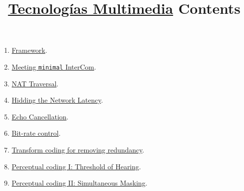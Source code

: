 
\title{\href{https://tecnologias-multimedia.github.io/}{Tecnologías Multimedia} \newline Contents}

\maketitle

\begin{enumerate}
\item \href{https://tecnologias-multimedia.github.io/contents/framework/}{Framework}. %
\item \href{https://tecnologias-multimedia.github.io/contents/minimal/}{Meeting \texttt{minimal} InterCom}. %
\item \href{https://tecnologias-multimedia.github.io/contents/NAT_traversal/}{NAT Traversal}. %
\item \href{https://tecnologias-multimedia.github.io/contents/latency/}{Hidding the Network Latency}. %
\item \href{https://tecnologias-multimedia.github.io/contents/echo_cancellation/}{Echo Cancellation}. %
\item \href{https://tecnologias-multimedia.github.io/contents/BR_control/}{Bit-rate control}. %
\item \href{https://tecnologias-multimedia.github.io/contents/transform_coding/}{Transform coding for removing redundancy}. %
\item \href{https://tecnologias-multimedia.github.io/contents/threshold_of_hearing/}{Perceptual coding I: Threshold of Hearing}.
\item \href{https://tecnologias-multimedia.github.io/contents/simultaneous_masking/}{Perceptual coding II: Simultaneous Masking}.
\end{enumerate}



